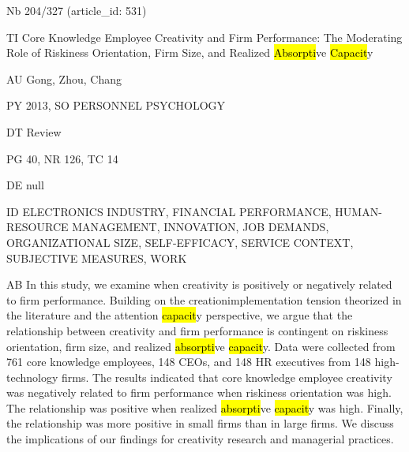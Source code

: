 \documentclass[a4paper]{article}
\begin{document}
\vspace*{-2cm}
Nb \tabto{0cm}204/327 (article\_id: 531)\par
TI \tabto{0cm}Core Knowledge Employee Creativity and Firm Performance: The Moderating Role of Riskiness Orientation, Firm Size, and Realized \hl{Absorpti}ve \hl{Capacit}y\par
AU \tabto{0cm}Gong, Zhou, Chang\par
PY \tabto{0cm}2013, SO PERSONNEL PSYCHOLOGY\par
DT \tabto{0cm}Review\par
PG \tabto{0cm}40, NR 126, TC 14\par
DE \tabto{0cm}null\par
ID \tabto{0cm}ELECTRONICS INDUSTRY, FINANCIAL PERFORMANCE, HUMAN-RESOURCE MANAGEMENT, INNOVATION, JOB DEMANDS, ORGANIZATIONAL SIZE, SELF-EFFICACY, SERVICE CONTEXT, SUBJECTIVE MEASURES, WORK\par
AB \tabto{0cm}In this study, we examine when creativity is positively or negatively related to firm performance. Building on the creationimplementation tension theorized in the literature and the attention \hl{capacit}y perspective, we argue that the relationship between creativity and firm performance is contingent on riskiness orientation, firm size, and realized \hl{absorpti}ve \hl{capacit}y. Data were collected from 761 core knowledge employees, 148 CEOs, and 148 HR executives from 148 high-technology firms. The results indicated that core knowledge employee creativity was negatively related to firm performance when riskiness orientation was high. The relationship was positive when realized \hl{absorpti}ve \hl{capacit}y was high. Finally, the relationship was more positive in small firms than in large firms. We discuss the implications of our findings for creativity research and managerial practices.\par
\clearpage
\end{document}
